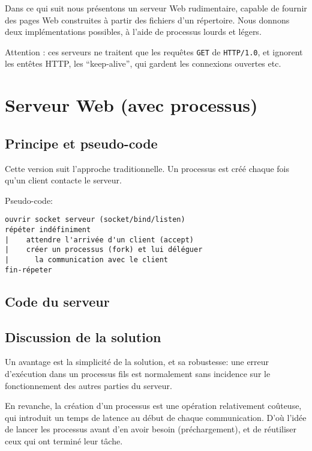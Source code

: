 
Dans ce qui suit nous présentons un serveur Web rudimentaire,
capable de fournir des pages Web construites à partir des fichiers
d'un répertoire. Nous donnons deux implémentations possibles,
à l'aide de processus lourds et légers.

Attention : ces serveurs ne traitent que les requêtes \texttt{GET} de
\texttt{HTTP/1.0}, et ignorent les entêtes HTTP, les ``keep-alive'',
qui gardent les connexions ouvertes etc.


\section{Serveur Web (avec processus)}

\subsection{Principe et pseudo-code}
Cette version suit l'approche traditionnelle. Un processus
est créé chaque fois qu'un client contacte le serveur.



Pseudo-code:


\extrait
\begin{lstlisting}
ouvrir socket serveur (socket/bind/listen)
répéter indéfiniment
|    attendre l'arrivée d'un client (accept)
|    créer un processus (fork) et lui déléguer
|      la communication avec le client
fin-répeter
\end{lstlisting}


\subsection{Code du serveur}

\source



\subsection{Discussion de la solution}

Un avantage est la simplicité de la solution, et sa robustesse:
une erreur d'exécution dans un processus fils est normalement
sans incidence sur le fonctionnement des autres parties du serveur.


En revanche, la création d'un processus est une opération
relativement coûteuse, qui introduit un temps de latence
au début de chaque communication.  D'où l'idée de lancer
les processus avant d'en avoir besoin (préchargement), 
et de réutiliser ceux qui ont terminé leur tâche.

